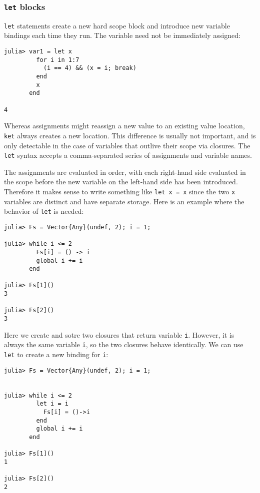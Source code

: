 \documentclass[
]{article}
\begin{document}
\hypertarget{let-blocks}{%
\subsubsection{\texorpdfstring{\texttt{let}
blocks}{let blocks}}\label{let-blocks}}

\texttt{let} statements create a new hard scope block and introduce new
variable bindings each time they run. The variable need not be
immediately assigned:

\begin{verbatim}
julia> var1 = let x
         for i in 1:7
           (i == 4) && (x = i; break)
         end
         x
       end

4
\end{verbatim}

Whereas assignments might reassign a new value to an existing value
location, \texttt{ket} always creates a new location. This difference is
usually not important, and is only detectable in the case of variables
that outlive their scope via closures. The \texttt{let} syntax accepts a
comma-separated series of assignments and variable names.

The assignments are evaluated in order, with each right-hand side
evaluated in the scope before the new variable on the left-hand side has
been introduced. Therefore it makes sense to write something like
\texttt{let\ x\ =\ x} since the two \texttt{x} variables are distinct
and have separate storage. Here is an example where the behavior of
\texttt{let} is needed:

\begin{verbatim}
julia> Fs = Vector{Any}(undef, 2); i = 1;

julia> while i <= 2
         Fs[i] = () -> i
         global i += i
       end

julia> Fs[1]()
3

julia> Fs[2]()
3
\end{verbatim}

Here we create and sotre two closures that return variable \texttt{i}.
However, it is always the same variable \texttt{i}, so the two closures
behave identically. We can use \texttt{let} to create a new binding for
\texttt{i}:

\begin{verbatim}
julia> Fs = Vector{Any}(undef, 2); i = 1;


julia> while i <= 2
         let i = i
           Fs[i] = ()->i
         end
         global i += i
       end

julia> Fs[1]()
1

julia> Fs[2]()
2
\end{verbatim}
\end{document}
